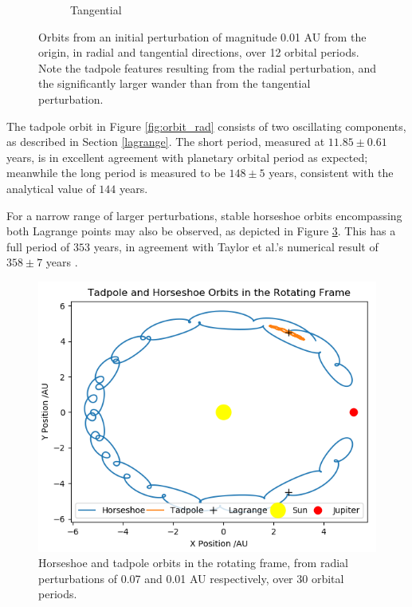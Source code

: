 \documentclass[11pt, a4paper,twocolumn]{article} %
\begin{document}
\begin{figure}[ht]
\begin{subfigure}{.23\textwidth}
		\caption{Tangential}
		\label{fig:orbit_tan}
	\end{subfigure}
	\caption{Orbits from an initial perturbation of magnitude 0.01 AU from the origin, in radial and tangential directions, over 12 orbital periods. Note the tadpole features resulting from the radial perturbation, and the significantly larger wander than from the tangential perturbation.}
	\label{fig:orbitplots}
\end{figure}

The tadpole orbit in Figure \ref{fig:orbit_rad} consists of two oscillating components, as described in Section \ref{lagrange}. The short period, measured at $11.85 \pm 0.61$ years, is in excellent agreement with  planetary orbital period as expected; meanwhile the long period is measured to be $148 \pm 5$ years, consistent with the analytical value of $144$ years.

For a narrow range of larger perturbations, stable horseshoe orbits encompassing both Lagrange points may also be observed, as depicted in Figure \ref{fig:horseshoe}. This has a full period of $353$ years, in agreement with Taylor et al.'s numerical result of $358 \pm 7$ years \cite{Taylor1981}.


\begin{figure}
	\centering
	\includegraphics[width=0.8\linewidth]{Figures/horseshoe}
	\caption{Horseshoe and tadpole orbits in the rotating frame, from radial perturbations of 0.07 and 0.01 AU respectively, over 30 orbital periods.}
	\label{fig:horseshoe}
\end{figure}
\end{document}
